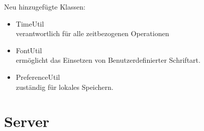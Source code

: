 \documentclass[a4paper]{scrreprt}
\begin{document}
                    Neu hinzugefügte Klassen:
                    \begin{itemize}
                        \item TimeUtil \\ verantwortlich für alle zeitbezogenen Operationen
                        \item FontUtil \\ ermöglicht das Einsetzen von Benutzerdefinierter Schriftart. 
                        \item PreferenceUtil \\ zuständig für lokales Speichern.
                    \end{itemize}

        \newpage
        \section{Server}
\end{document}
